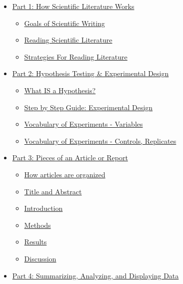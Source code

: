 \documentclass[
]{book}
\providecommand{\tightlist}{%
  \setlength{\itemsep}{0pt}\setlength{\parskip}{0pt}}
\begin{document}
\begin{itemize}
\tightlist
\item
  \protect\hyperlink{goals100}{Part 1: How Scientific Literature Works}

  \begin{itemize}
  \tightlist
  \item
    \protect\hyperlink{goals100}{Goals of Scientific Writing}
  \item
    \protect\hyperlink{reading120}{Reading Scientific Literature}
  \item
    \protect\hyperlink{readstrats125}{Strategies For Reading Literature}
  \end{itemize}
\item
  \protect\hyperlink{hypothesis200}{Part 2: Hypothesis Testing \& Experimental Design}

  \begin{itemize}
  \tightlist
  \item
    \protect\hyperlink{hypothesis200}{What IS a Hypothesis?}
  \item
    \protect\hyperlink{expdesign210}{Step by Step Guide: Experimental Design}
  \item
    \protect\hyperlink{variables215}{Vocabulary of Experiments - Variables}
  \item
    \protect\hyperlink{replicates220}{Vocabulary of Experiments - Controls, Replicates}
  \end{itemize}
\item
  \protect\hyperlink{articleparts300}{Part 3: Pieces of an Article or Report}

  \begin{itemize}
  \tightlist
  \item
    \protect\hyperlink{articleparts300}{How articles are organized}
  \item
    \protect\hyperlink{titles320}{Title and Abstract}
  \item
    \protect\hyperlink{introduction340}{Introduction}
  \item
    \protect\hyperlink{methods350}{Methods}
  \item
    \protect\hyperlink{results360}{Results}
  \item
    \protect\hyperlink{discussion380}{Discussion}
  \end{itemize}
\item
  \protect\hyperlink{datatypes400}{Part 4: Summarizing, Analyzing, and Displaying Data}


\end{itemize}
\end{document}
